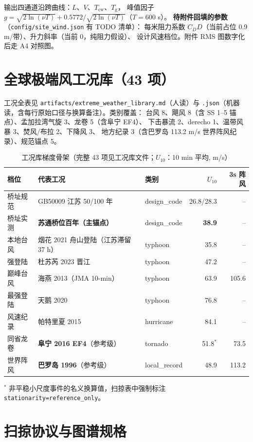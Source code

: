 \documentclass[11pt,a4paper]{ctexart}
\begin{document}
输出四通道沿跨曲线：$L$、$V$、$T_{\text{cw}}$、$T_{\text{g}}$，
峰值因子 $g=\sqrt{2\ln(\nu T)}+0.5772/\sqrt{2\ln(\nu T)}$（$T=600$ s）。
\textbf{待附件回填的参数}（\texttt{config/site\_wind.json} 有 TODO 清单）：
每米阻力系数 $C_D D$（当前占位 0.9 m/带）、升力斜率（当前 0，纯阻力假设）、
设计风速档位。附件 RMS 图数字化后走 A4 对照图。

\section{全球极端风工况库（43 项）}

工况全表见 \texttt{artifacts/extreme\_weather\_library.md}（人读）与
\texttt{.json}（机器读，含每行原始口径与换算备注）。类别覆盖：
台风 8、飓风 8（含 SS 1--5 锚点）、孟加拉湾气旋 3、龙卷 5（含阜宁 EF4）、
下击暴流 2、derecho 1、温带风暴 3、焚风/布拉 2、下降风 3、
地方纪录 3（含巴罗岛 113.2 m/s 世界阵风纪录）、规范锚点 5。

\begin{table}[h]\centering\footnotesize
\caption{工况库梯度骨架（完整 43 项见工况库文件；$U_{10}$：10 min 平均, m/s）}
\begin{tabular}{lllrr}
\toprule
档位 & 代表工况 & 类别 & $U_{10}$ & 3s 阵风\\
\midrule
桥址规范 & GB50009 江苏 50/100 年 & design\_code & 26.8/28.3 & --\\
桥址实测 & \textbf{苏通桥位百年（主锚点）} & design\_code & \textbf{38.9} & --\\
本地台风 & 烟花 2021 舟山登陆（江苏滞留 37 h） & typhoon & 35.8 & --\\
强登陆 & 杜苏芮 2023 晋江 & typhoon & 47.2 & --\\
巅峰台风 & 海燕 2013（JMA 10-min） & typhoon & 63.9 & 105.6\\
最强登陆 & 天鹅 2020 & typhoon & 76.8 & --\\
风速纪录 & 帕特里夏 2015 & hurricane & 84.1 & --\\
同省龙卷 & \textbf{阜宁 2016 EF4}（参考级） & tornado & 51.8$^{*}$ & 73.5\\
世界阵风 & \textbf{巴罗岛 1996}（参考级） & local\_record & 48.9 & 113.2\\
\bottomrule
\end{tabular}
\end{table}

$^{*}$ 非平稳小尺度事件的名义换算值，扫掠表中强制标注
\texttt{stationarity=reference\_only}。

\section{扫掠协议与图谱规格}
\end{document}
